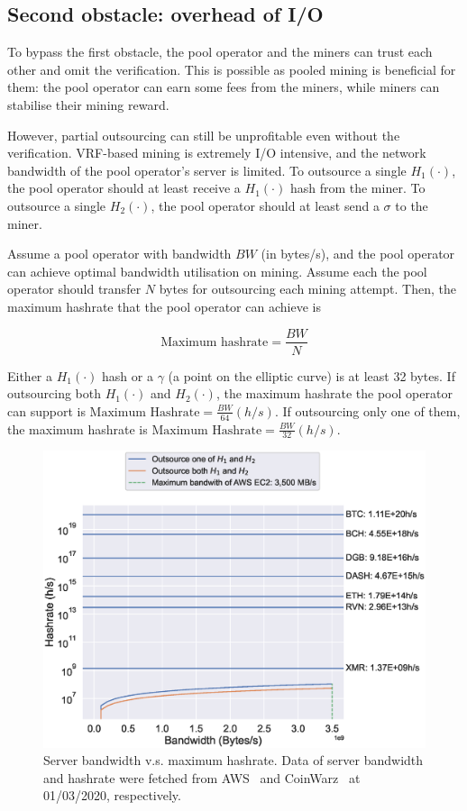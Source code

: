 \subsection{Second obstacle: overhead of I/O}
To bypass the first obstacle, the pool operator and the miners can trust each other and omit the verification.
This is possible as pooled mining is beneficial for them: the pool operator can earn some fees from the miners, while miners can stabilise their mining reward.

However, partial outsourcing can still be unprofitable even without the verification.
VRF-based mining is extremely I/O intensive, and the network bandwidth of the pool operator's server is limited.
To outsource a single $H_1(\cdot)$, the pool operator should at least receive a $H_1(\cdot)$ hash from the miner.
To outsource a single $H_2(\cdot)$, the pool operator should at least send a $\sigma$ to the miner.

Assume a pool operator with bandwidth $BW$ (in bytes/s), and the pool operator can achieve optimal bandwidth utilisation on mining.
Assume each the pool operator should transfer $N$ bytes for outsourcing each mining attempt.
Then, the maximum hashrate that the pool operator can achieve is

$$\text{Maximum hashrate} = \frac{BW}{N}$$

Either a $H_1(\cdot)$ hash or a $\gamma$ (a point on the elliptic curve) is at least 32 bytes.
If outsourcing both $H_1(\cdot)$ and $H_2(\cdot)$, the maximum hashrate the pool operator can support is $\text{Maximum Hashrate} = \frac{BW}{64} (h/s)$.
If outsourcing only one of them, the maximum hashrate is $\text{Maximum Hashrate} = \frac{BW}{32} (h/s)$.

\begin{figure}[htp]
    \centering
    \includegraphics[width=.8\linewidth]{figs/max-hashrate.eps}
    \caption{Server bandwidth v.s. maximum hashrate. Data of server bandwidth and hashrate were fetched from AWS~\cite{aws} and CoinWarz~\cite{coinwarz} at 01/03/2020, respectively.}
    \label{fig:max-hashrate}
\end{figure}


